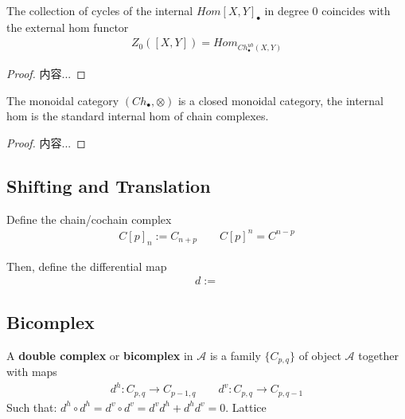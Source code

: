 \documentclass[Total.tex]{subfiles}
\begin{document}
				\begin{proposition}
					The collection of cycles of the internal $Hom[X,Y]_\bullet$ in degree $0$ coincides with the external hom functor
					\begin{gather*}
						Z_0([X,Y])=Hom_{Ch_\bullet^{ub}(X,Y)}
					\end{gather*}
				\end{proposition}
				\begin{proof}
					内容...
				\end{proof}
				
				\begin{proposition}
					The monoidal category $(Ch_\bullet,\otimes)$ is a closed monoidal category, the internal hom is the standard internal hom of chain complexes.
				\end{proposition}
				\begin{proof}
					内容...
				\end{proof}
			\subsection{Shifting and Translation}
				\begin{Def}
					Define the chain/cochain complex
					\begin{gather*}
						C[p]_n:=C_{n+p}\qquad C[p]^n=C^{n-p}
					\end{gather*}
				\end{Def}
				Then, define the differential map
				\begin{gather*}
					d:=
				\end{gather*}
				
			\subsection{Bicomplex}
				\begin{Def}
					A \textbf{double complex} or \textbf{bicomplex} in $\mathcal{A}$ is a family $\{C_{p,q}\}$ of object $\mathcal{A}$ together with maps
					\begin{gather*}
						d^h:C_{p,q}\rightarrow C_{p-1,q}\qquad d^v:C_{p,q}\rightarrow C_{p,q-1}
					\end{gather*}
					Such that: $d^h\circ d^h=d^v\circ d^v=d^vd^h+d^hd^v=0$. Lattice
					\begin{center}
						{\small	{}}
					\end{center}
				\end{Def}
\end{document}
